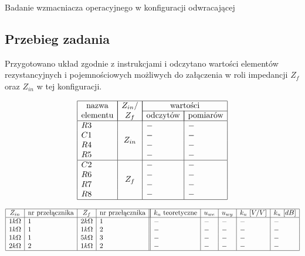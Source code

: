 \documentclass[polish,polish,a4paper]{article}
\begin{document}
\begin{spacing}{1.3}
Badanie wzmacniacza operacyjnego w konfiguracji odwracającej

\subsection{Przebieg zadania}

Przygotowano układ zgodnie z instrukcjami i odczytano wartości elementów rezystancyjnych i pojemnościowych możliwych do załączenia w roli impedancji $Z_{f}$ oraz $Z_{in}$ w tej konfiguracji.

\begin{spacing}{1.5}
	\begin{equation*}
	\begin{array}{|l|c|l|l|}
	\hline
	\multicolumn{1}{|c|}{$nazwa$}&\multicolumn{1}{|c|}{Z_{in}/}&\multicolumn{2}{|c|}{$wartości$}\\\cline{3-4}
	\multicolumn{1}{|c|}{$elementu$}&\multicolumn{1}{|c|}{Z_{f}}&\multicolumn{1}{|c|}{$odczytów$}&\multicolumn{1}{|c|}{$pomiarów$}\\
	\hline
	R3&\multirow{4}{*}{$Z_{in}$}&-&-\\
	C1&&-&-\\
	R4&&-&-\\
	R5&&-&-\\\hline
	C2&\multirow{4}{*}{$Z_{f}$}&-&-\\
	R6&&-&-\\
	R7&&-&-\\
	R8&&-&-\\\hline
	\end{array}
	\end{equation*}
\end{spacing}

\begin{spacing}{1.5}
	\begin{equation*}
	\begin{array}{|l|l|l|l||l|l|l|l|l|}
	\hline
	\multicolumn{1}{|c|}{Z_{in}}&\multicolumn{1}{c|}{$nr przełącznika$}&\multicolumn{1}{c|}{Z_{f}}&\multicolumn{1}{c||}{$nr przełącznika$}&
	\multicolumn{1}{|c|}{k_{u} $ teoretyczne$}&\multicolumn{1}{c|}{u_{we}}&\multicolumn{1}{c|}{u_{wy}}&\multicolumn{1}{c|}{k_{u}$ $ [V/V]}&\multicolumn{1}{c|}{k_{u} $ $ [dB]}\\
	\hline
	1k\Omega&1&2k\Omega&1&-&-&-&-&-\\
	1k\Omega&1&1k\Omega&2&-&-&-&-&-\\
	1k\Omega&1&5k\Omega&3&-&-&-&-&-\\
	2k\Omega&2&1k\Omega&2&-&-&-&-&-\\
	\hline
	\end{array}
	\end{equation*}
\end{spacing}




\end{spacing}
\end{document}
